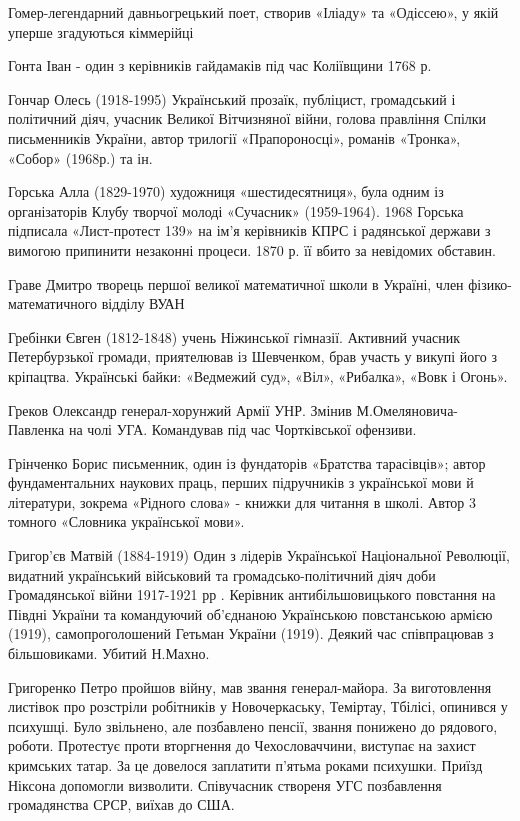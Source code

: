 Гомер-легендарний давньогрецький поет, створив «Іліаду» та «Одіссею», у якій уперше згадуються кіммерійці

Гонта Іван  - один з керівників гайдамаків під час Коліївщини 1768 р. 

Гончар Олесь (1918-1995) Український прозаїк, публіцист, громадський і політичний діяч, учасник Великої Вітчизняної війни, голова правління Спілки письменників України, автор трилогії «Прапороносці», романів «Тронка», «Собор» (1968р.) та ін. 

Горська Алла (1829-1970) художниця «шестидесятниця», була одним із організаторів Клубу творчої молоді «Сучасник» (1959-1964). 1968 Горська підписала «Лист-протест 139» на ім'я керівників КПРС і радянської держави з вимогою припинити незаконні процеси. 1870 р. її вбито за невідомих обставин.

Граве Дмитро творець першої великої математичної школи в Україні, член фізико-математичного відділу ВУАН 

Гребінки Євген (1812-1848) учень Ніжинської гімназії. Активний учасник Петербурзької громади, приятелював із Шевченком, брав участь у викупі його з кріпацтва. Українські байки: «Ведмежий суд», «Віл», «Рибалка», «Вовк і Огонь».

Греков Олександр  генерал-хорунжий Армії УНР. Змінив М.Омеляновича-Павленка на чолі УГА. Командував під час Чортківської офензиви.

Грінченко Борис письменник, один із фундаторів «Братства тарасівців»; автор фундаментальних наукових праць, перших підручників з української мови й літератури, зокрема «Рідного слова» - книжки для читання в школі. Автор 3 томного «Словника української мови».

Григор’єв Матвій  (1884-1919) Один з лідерів Української Національної Революції, видатний український військовий та громадсько-політичний діяч доби Громадянської війни 1917-1921 рр . Керівник антибільшовицького повстання на Півдні України та командуючий об’єднаною Українською повстанською армією (1919), самопроголошений Гетьман України (1919). Деякий час співпрацював з більшовиками. Убитий Н.Махно.

Григоренко Петро пройшов війну, мав звання генерал-майора. За виготовлення листівок про розстріли робітників у Новочеркаську, Теміртау, Тбілісі, опинився у психушці. Було звільнено, але позбавлено пенсії, звання понижено до рядового, роботи. Протестує проти вторгнення до Чехословаччини, виступає на захист кримських татар. За це довелося заплатити п’ятьма роками психушки. Приїзд Ніксона допомогли визволити. Співучасник створеня УГС позбавлення громадянства СРСР, виїхав до США.

